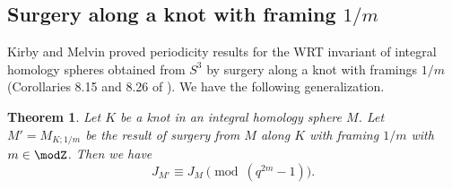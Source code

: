 \documentclass{amsart}
\numberwithin{equation}{section}
\numberwithin{figure}{section}
\theoremstyle{plain}
\newtheorem{theorem}{Theorem}[section]
\theoremstyle{definition}
\theoremstyle{remark}
\begin{document}
\subsection{Surgery along a knot with framing $1/m$}
\label{sec:surgery-along-knot}

Kirby and Melvin proved periodicity results for the WRT invariant of
integral homology spheres obtained from $S^3$ by surgery along a knot
with framings $1/m$ (Corollaries 8.15 and 8.26 of
\cite{Kirby-Melvin}).  We have the following generalization.

\begin{theorem}
  \label{r9}
  Let $K$ be a knot in an integral homology sphere $M$.  Let
  $M'=M_{K;1/m}$ be the result of surgery from $M$ along $K$ with
  framing $1/m$ with $m\in \modZ $.  Then we have
  \begin{equation*}
    J_{M'}\equiv J_M \pmod{(q^{2m}-1)}.
  \end{equation*}
\end{theorem}
\end{document}
